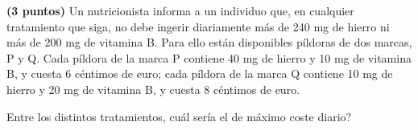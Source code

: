 
\textbf{(3 puntos)} Un nutricionista informa a un individuo que, en cualquier tratamiento que siga, no debe ingerir diariamente más de 240 mg de hierro ni más de 200 mg de vitamina B. Para ello están disponibles píldoras de dos marcas, P y Q. Cada píldora de la marca P contiene 40 mg de hierro y 10 mg de vitamina B, y cuesta 6 céntimos de euro; cada píldora de la marca Q contiene 10 mg de hierro y 20 mg de vitamina B, y cuesta 8 céntimos de euro.

Entre los distintos tratamientos, \textquestiondown{}cuál sería el de máximo coste diario?
